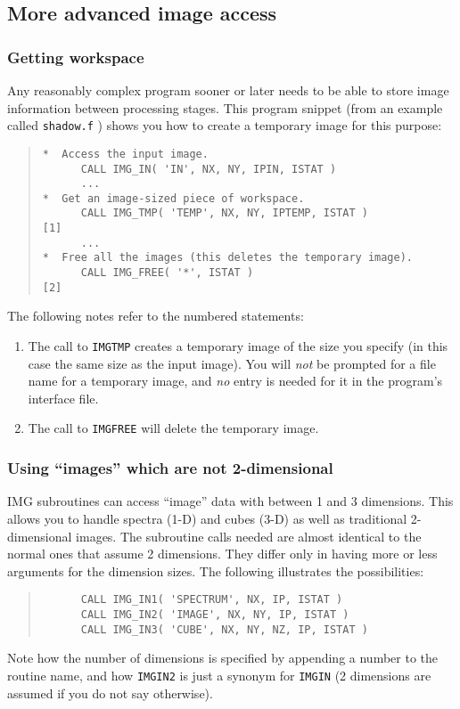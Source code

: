 \documentclass[twoside,11pt]{article}
\newcommand{\htmladdnormallink}[2]{#1}
\newcommand{\htmlref}[2]{#1}
\renewcommand{\_}{\texttt{\symbol{95}}}
\newcommand{\myverb}[1]{{\texttt{#1}}}
\newcommand{\mynote}{The following notes refer to the numbered statements:}
\newenvironment{code}{\begin{small} \begin{quote}}
                     {\end{quote} \end{small}}
\newenvironment{enumnotes}
{
   \renewcommand{\labelenumi}{\myverb{[\theenumi]}}
   \begin{enumerate}
}{
   \end{enumerate}
   \renewcommand{\labelenumi}{\theenumi}
}
\renewenvironment{enumnotes}
  {
    \begin{enumerate}
  }{
    \end{enumerate}
  }
\begin{document}
\subsection{More advanced image access}
\subsubsection{Getting workspace}
Any reasonably complex program sooner or later needs to be able to
store image information between processing stages. This program
snippet (from an example called
\htmladdnormallink{\myverb{shadow.f}}{../../bin/examples/img/shadow.f}
)
shows you how to create a temporary image for this purpose:
\begin{code}
\begin{verbatim}
*  Access the input image.
      CALL IMG_IN( 'IN', NX, NY, IPIN, ISTAT )
      ...
*  Get an image-sized piece of workspace.
      CALL IMG_TMP( 'TEMP', NX, NY, IPTEMP, ISTAT )           [1]
      ...
*  Free all the images (this deletes the temporary image).
      CALL IMG_FREE( '*', ISTAT )                             [2]
\end{verbatim}
\end{code}
\mynote
\begin{enumnotes}
\item The call to \htmlref{\myverb{IMG\_TMP}}{IMG_TMPnx} creates a temporary image of
the size you specify (in this case the same size as the input image).
You will {\em not} be prompted for a file name for a temporary image,
and {\em no } entry is needed for it in the program's interface file.

\item The call to \htmlref{\myverb{IMG\_FREE}}{IMG_FREE} will delete the temporary image.
\end{enumnotes}

\subsubsection{Using ``images'' which are not 2-dimensional}
IMG subroutines can access ``image'' data with between 1 and 3
dimensions. This allows you to handle spectra (1-D) and cubes (3-D) as
well as traditional 2-dimensional images. The subroutine calls needed
are almost identical to the normal ones  that assume 2
dimensions. They differ only in having more or less arguments for the
dimension sizes. The following illustrates the possibilities:
\begin{code}
\begin{verbatim}
      CALL IMG_IN1( 'SPECTRUM', NX, IP, ISTAT )
      CALL IMG_IN2( 'IMAGE', NX, NY, IP, ISTAT )
      CALL IMG_IN3( 'CUBE', NX, NY, NZ, IP, ISTAT )
\end{verbatim}
\end{code}
Note how the number of dimensions is specified by appending a number
to the routine name, and how \myverb{IMG\_IN2} is just a synonym for
\htmlref{\myverb{IMG\_IN}}{IMG_INnx} (2 dimensions are assumed if you do not say
otherwise).
\end{document}

